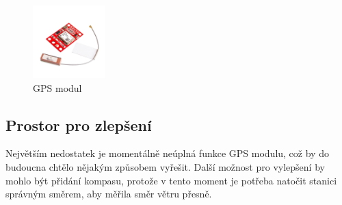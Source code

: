 \begin{figure}[h] 
    \centering
    \includegraphics[width=0.25\textwidth]{images/GPS_modul.jpg}
    \caption{GPS modul}
\end{figure}

\subsection{Prostor pro zlepšení}
Největším nedostatek je momentálně neúplná funkce GPS modulu, což by do budoucna chtělo nějakým způsobem vyřešit.
Další možnost pro vylepšení by mohlo být přidání kompasu, protože v tento moment je potřeba natočit stanici správným směrem, aby měřila směr větru přesně. 


